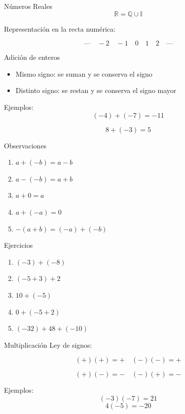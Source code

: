 \documentclass{beamer}
\begin{document}
	\begin{frame}{Números Reales}
		\[
		\mathbb{R}=\mathbb{Q}\cup \mathbb{I}
		\]
		
		Representación en la recta numérica:
		
		\[
		\text{---}\quad -2 \quad -1 \quad 0 \quad 1 \quad 2 \quad \text{---}
		\]
	\end{frame}
	
	\begin{frame}{Adición de enteros}
		\begin{itemize}
			\item Mismo signo: se suman y se conserva el signo
			\item Distinto signo: se restan y se conserva el signo mayor
		\end{itemize}
		
		\pause
		
		Ejemplos:
		\[
		(-4)+(-7)=-11
		\]
		
		\[
		8+(-3)=5
		\]
	\end{frame}
	
	\begin{frame}{Observaciones}
		\begin{enumerate}
			\item \(a+(-b)=a-b\)
			\item \(a-(-b)=a+b\)
			\item \(a+0=a\)
			\item \(a+(-a)=0\)
			\item \(-(a+b)=(-a)+(-b)\)
		\end{enumerate}
	\end{frame}
	
	\begin{frame}{Ejercicios}
		\begin{enumerate}
			\item \((-3)+(-8)\)
			\item \((-5+3)+2\)
			\item \(10+(-5)\)
			\item \(0+(-5+2)\)
			\item \((-32)+48+(-10)\)
		\end{enumerate}
	\end{frame}
	
	\begin{frame}{Multiplicación}
		Ley de signos:
		
		\[
		(+)(+)=+ \quad (-)(-) = +
		\]
		
		\[
		(+)(-)=- \quad (-)(+)=- 
		\]
		
		Ejemplos:
		\[
		(-3)(-7)=21
		\]
		\[
		4(-5)=-20
		\]
	\end{frame}
	
\end{document}
